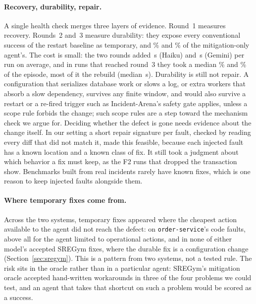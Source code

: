 \paragraph{Recovery, durability, repair.} A single health check merges three layers of evidence. Round~1 measures
recovery. Rounds~2 and~3 measure durability: they expose every conventional success of the restart baseline as temporary,
and \nummitTempShareHaiku\% and \nummitTempShareGemini\% of the mitigation-only agent's. The cost is small: the two
rounds added \numoracleAddedHaiku\,s (Haiku) and \numoracleAddedGemini\,s (Gemini) per run on average, and in runs that
reached round~3 they took a median \numoracleShareHaiku\% and \numoracleShareGemini\% of the episode, most of it the
rebuild (median \numroundThreeHaiku\,s). Durability is still not repair. A configuration that serializes database work or slows a log,
or extra workers that absorb a slow dependency, survives any finite window, and would also survive a restart or a
re-fired trigger such as Incident-Arena's safety gate applies, unless a scope rule forbids the change; such scope rules
are a step toward the mechanism check we argue for. Deciding whether the defect is gone needs
evidence about the change itself. In our setting a short repair signature per fault, checked by reading every diff that
did not match it, made this feasible, because each injected fault has a known location and a known class of fix. It
still took a judgment about which behavior a fix must keep, as the F2 runs that dropped the transaction show. Benchmarks
built from real incidents rarely have known fixes, which is one reason to keep injected faults alongside them.

\paragraph{Where temporary fixes come from.} Across the two systems, temporary fixes appeared where the cheapest action
available to the agent did not reach the defect: on \texttt{order-service}'s code faults, above all for the agent limited
to operational actions, and in none of either model's accepted SREGym fixes, where the durable fix is a configuration
change (Section~\ref{sec:sregym}). This is a pattern from two systems, not a tested rule. The risk sits in the oracle rather than in a particular agent: SREGym's mitigation oracle
accepted hand-written workarounds in three of the four problems we could test, and an agent that takes that shortcut on
such a problem would be scored as a success.

